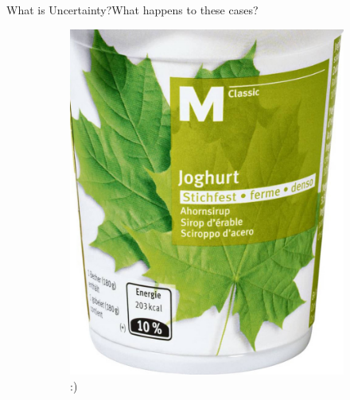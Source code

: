 \documentclass{beamer}
\begin{document}
\begin{frame}{What is Uncertainty?}{What happens to these cases?}
\begin{figure}[H]
	\centering
	\begin{subfigure}{.32\textwidth}
		\centering
		\includegraphics[width=\textwidth]{m-classic-joghurt-ahornsirup-stichfest-zoom1}
		\pause
		:)
	\end{subfigure}\pause
	\begin{subfigure}{.32\textwidth}
		\centering

\end{subfigure}
\end{figure}
\end{frame}
\end{document}
